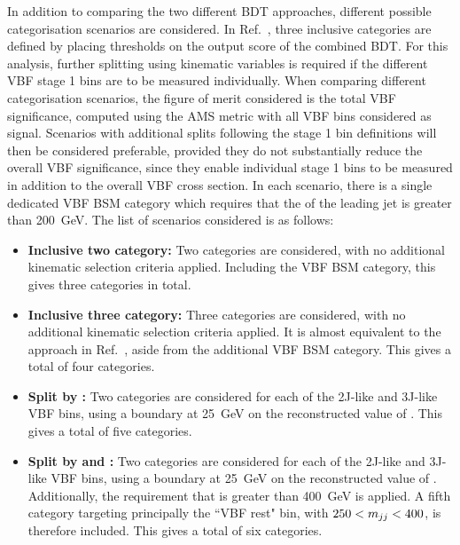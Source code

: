 In addition to comparing the two different BDT approaches, 
different possible categorisation scenarios are considered.
In Ref.~\cite{HIG-16-040}, three inclusive categories are defined 
by placing thresholds on the output score of the combined BDT.
For this analysis, further splitting using kinematic variables is required 
if the different VBF stage 1 bins are to be measured individually.
When comparing different categorisation scenarios,
the figure of merit considered is the total VBF significance, 
computed using the AMS metric with all VBF bins considered as signal.
Scenarios with additional splits following the stage 1 bin definitions 
will then be considered preferable, 
provided they do not substantially reduce the overall VBF significance, 
since they enable individual stage 1 bins to be measured in addition to the overall VBF cross section.
In each scenario, there is a single dedicated VBF BSM category 
which requires that the \pt of the leading jet is greater than \SI{200}{GeV}.
The list of scenarios considered is as follows:
\begin{itemize}
\item \textbf{Inclusive two category:} Two categories are considered, 
      with no additional kinematic selection criteria applied.
      Including the VBF BSM category, this gives three categories in total.
\item \textbf{Inclusive three category:} Three categories are considered, 
      with no additional kinematic selection criteria applied.
      It is almost equivalent to the approach in Ref.~\cite{HIG-16-040}, 
      aside from the additional VBF BSM category.
      This gives a total of four categories.
\item \textbf{Split by \ptHjj:} Two categories are considered 
      for each of the 2J-like and 3J-like VBF bins,
      using a boundary at \SI{25}{GeV} on the reconstructed value of \ptHjj.
      This gives a total of five categories.
\item \textbf{Split by \ptHjj and \mjj:} Two categories are considered
      for each of the 2J-like and 3J-like VBF bins,
      using a boundary at \SI{25}{GeV} on the reconstructed value of \ptHjj.
      Additionally, the requirement that \mjj is greater than \SI{400}{GeV} is applied.
      A fifth category targeting principally the ``VBF rest" bin, with $250 < m_{jj} < 400$,
      is therefore included.
      This gives a total of six categories.
\end{itemize}

